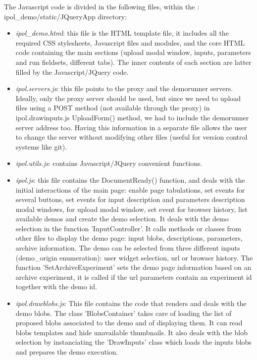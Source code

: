 The Javascript code is divided in the following files, within the :
ipol\_demo/\-static/\-JQuery\-App directory:
\begin{itemize}

 \item \emph{ipol\_demo.html}: this file is the HTML template file, it includes all the
  required CSS stylesheets, Javascript files and modules, and the core HTML
  code containing the main sections (upload modal window, inputs, parameters and 
  run fieldsets, different tabs). The inner contents of each section are latter
  filled by the Javascript/JQuery code.

 \item \emph{ipol.servers.js}: this file points to the proxy and the demorunner
  servers. Ideally, only the proxy server should be used, but since we need to upload
  files using a POST method (not available through the proxy) in ipol.drawinputs.js 
  UploadForm() method, we had to include the demorunner server address too.
  Having this information in a separate file allows the user to change the server
  without modifying other files (useful for version control systems like git).

 \item \emph{ipol.utils.js}: contains Javascript/JQuery convenient functions.

 \item \emph{ipol.js}: this file contains the DocumentReady() function,
  and deals with the initial interactions of the main page: enable page tabu\-lations,
  set events for several buttons, set events for input description and parameters
  description modal windows, for upload modal window, set event for browser history,
  list available demos and create the demo selection. It deals with
  the demo selection in the function 'Input\-Controller'. It calls methods or classes
  from other files to display the demo page: input blobs, descriptions, parameters,
  archive information. 
  The demo can be selected
  from three different inputs (demo\_origin enumeration): user widget selection,
  url or browser history. The function 'Set\-Archive\-Experiment' sets the demo
  page information based on an archive experiment, it is called if the url parameters
  contain an experiment id together with the demo id.


 \item \emph{ipol.drawblobs.js}: This file contains the code that renders and 
  deals with the demo blobs. The class 'BlobsContainer' takes care of loading
  the list of proposed blobs associated to the demo and of displaying them.
  It can read blobs templates and hide unavailable thumbnails. It also
  deals with the blob selection by instanciating the 'DrawInputs' class which loads
  the inputs blobs and prepares the demo execution.


\end{itemize}

